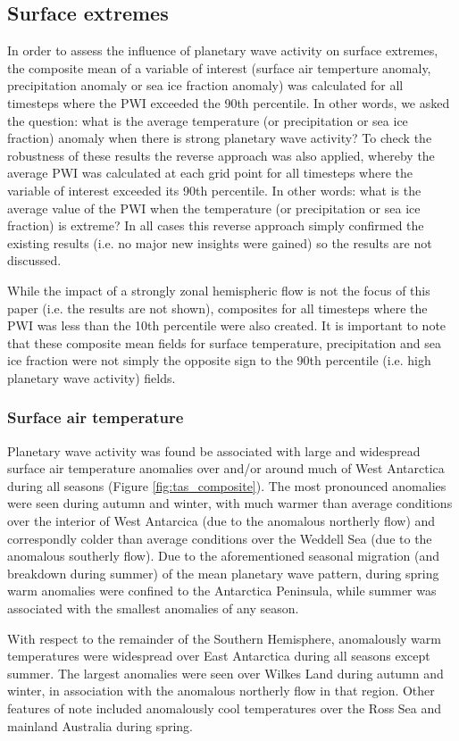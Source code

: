 \subsection{Surface extremes}

In order to assess the influence of planetary wave activity on surface extremes, the composite mean of a variable of interest (surface air temperture anomaly, precipitation anomaly or sea ice fraction anomaly) was calculated for all timesteps where the PWI exceeded the 90th percentile. In other words, we asked the question: what is the average temperature (or precipitation or sea ice fraction) anomaly when there is strong planetary wave activity? To check the robustness of these results the reverse approach was also applied, whereby the average PWI was calculated at each grid point for all timesteps where the variable of interest exceeded its 90th percentile. In other words: what is the average value of the PWI when the temperature (or precipitation or sea ice fraction) is extreme? In all cases this reverse approach simply confirmed the existing results (i.e. no major new insights were gained) so the results are not discussed.

While the impact of a strongly zonal hemispheric flow is not the focus of this paper (i.e. the results are not shown), composites for all timesteps where the PWI was less than the 10th percentile were also created. It is important to note that these composite mean fields for surface temperature, precipitation and sea ice fraction were not simply the opposite sign to the 90th percentile (i.e. high planetary wave activity) fields. 


\subsubsection{Surface air temperature}

Planetary wave activity was found be associated with large and widespread surface air temperature anomalies over and/or around much of West Antarctica during all seasons (Figure \ref{fig:tas_composite}). The most pronounced anomalies were seen during autumn and winter, with much warmer than average conditions over the interior of West Antarcica (due to the anomalous northerly flow) and correspondly colder than average conditions over the Weddell Sea (due to the anomalous southerly flow). Due to the aforementioned seasonal migration (and breakdown during summer) of the mean planetary wave pattern, during spring warm anomalies were confined to the Antarctica Peninsula, while summer was associated with the smallest anomalies of any season.  

With respect to the remainder of the Southern Hemisphere, anomalously warm temperatures were widespread over East Antarctica during all seasons except summer. The largest anomalies were seen over Wilkes Land during autumn and winter, in association with the anomalous northerly flow in that region. Other features of note included anomalously cool temperatures over the Ross Sea and mainland Australia during spring.

